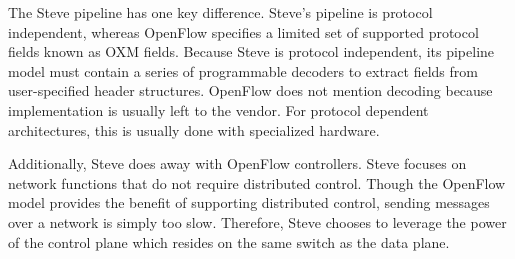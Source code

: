 The Steve pipeline has one key difference.
Steve's pipeline is protocol independent, whereas OpenFlow specifies a limited set of
supported protocol fields known as OXM fields.
Because Steve is protocol independent, its
pipeline model must contain a series of programmable decoders to extract fields
from user-specified header structures. 
OpenFlow does not mention decoding because
implementation is usually left to the vendor.
For protocol dependent architectures, this is
usually done with specialized hardware.

Additionally, Steve does away with OpenFlow controllers. 
Steve focuses on network functions that do not require distributed control.
Though the OpenFlow model provides
the benefit of supporting distributed control, sending messages
over a network is simply too slow.
Therefore, Steve chooses to leverage the power of the control plane which
resides on the same switch as the data plane.


%

